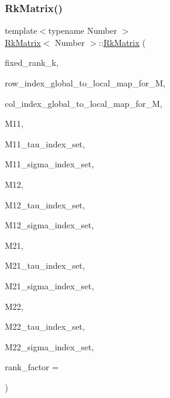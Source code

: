 \subsubsection{\texorpdfstring{Rk\+Matrix()}{RkMatrix()}\hspace{0.1cm}{\footnotesize\ttfamily [17/18]}}
{\footnotesize\ttfamily template$<$typename Number $>$ \\
\hyperlink{classRkMatrix}{Rk\+Matrix}$<$ Number $>$\+::\hyperlink{classRkMatrix}{Rk\+Matrix} (\begin{DoxyParamCaption}\item[{const \hyperlink{classRkMatrix_add060bfc3a4cc77f858c3d6dd58cadd5}{size\+\_\+type}}]{fixed\+\_\+rank\+\_\+k,  }\item[{const std\+::map$<$ types\+::global\+\_\+dof\+\_\+index, size\+\_\+t $>$ \&}]{row\+\_\+index\+\_\+global\+\_\+to\+\_\+local\+\_\+map\+\_\+for\+\_\+M,  }\item[{const std\+::map$<$ types\+::global\+\_\+dof\+\_\+index, size\+\_\+t $>$ \&}]{col\+\_\+index\+\_\+global\+\_\+to\+\_\+local\+\_\+map\+\_\+for\+\_\+M,  }\item[{const \hyperlink{classRkMatrix}{Rk\+Matrix}$<$ Number $>$ \&}]{M11,  }\item[{const std\+::vector$<$ types\+::global\+\_\+dof\+\_\+index $>$ \&}]{M11\+\_\+tau\+\_\+index\+\_\+set,  }\item[{const std\+::vector$<$ types\+::global\+\_\+dof\+\_\+index $>$ \&}]{M11\+\_\+sigma\+\_\+index\+\_\+set,  }\item[{const \hyperlink{classRkMatrix}{Rk\+Matrix}$<$ Number $>$ \&}]{M12,  }\item[{const std\+::vector$<$ types\+::global\+\_\+dof\+\_\+index $>$ \&}]{M12\+\_\+tau\+\_\+index\+\_\+set,  }\item[{const std\+::vector$<$ types\+::global\+\_\+dof\+\_\+index $>$ \&}]{M12\+\_\+sigma\+\_\+index\+\_\+set,  }\item[{const \hyperlink{classRkMatrix}{Rk\+Matrix}$<$ Number $>$ \&}]{M21,  }\item[{const std\+::vector$<$ types\+::global\+\_\+dof\+\_\+index $>$ \&}]{M21\+\_\+tau\+\_\+index\+\_\+set,  }\item[{const std\+::vector$<$ types\+::global\+\_\+dof\+\_\+index $>$ \&}]{M21\+\_\+sigma\+\_\+index\+\_\+set,  }\item[{const \hyperlink{classRkMatrix}{Rk\+Matrix}$<$ Number $>$ \&}]{M22,  }\item[{const std\+::vector$<$ types\+::global\+\_\+dof\+\_\+index $>$ \&}]{M22\+\_\+tau\+\_\+index\+\_\+set,  }\item[{const std\+::vector$<$ types\+::global\+\_\+dof\+\_\+index $>$ \&}]{M22\+\_\+sigma\+\_\+index\+\_\+set,  }\item[{const Number}]{rank\+\_\+factor = {} }\end{DoxyParamCaption})}

